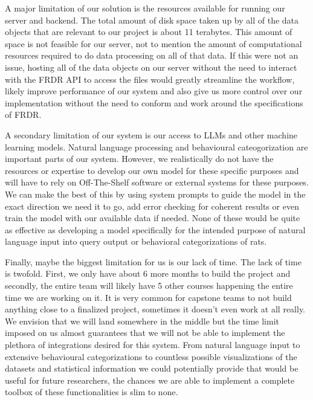 \documentclass[12pt, titlepage]{article}
\begin{document}
\begin{enumerate}
    A major limitation of our solution is the resources available for running our server and backend. The total amount of disk space taken up by 
    all of the data objects that are relevant to our project is about 11 terabytes. This amount of space is not feasible for our server, not to mention
    the amount of computational resources required to do data processing on all of that data. If this were not an issue, hosting all of the data objects
    on our server without the need to interact with the FRDR API to access the files would greatly streamline the workflow, likely improve performance
    of our system and also give us more control over our implementation without the need to conform and work around the specifications of FRDR.

    A secondary limitation of our system is our access to LLMs and other machine learning models. Natural language processing and behavioural cateogorization are important parts of our
    system. However, we realistically do not have the resources or expertise to develop our own model for these specific purposes and will have to rely
    on Off-The-Shelf software or external systems for these purposes. We can make the best of this by using system prompts to guide the model in the exact direction
    we need it to go, add error checking for coherent results or even train the model with our available data if needed. None of these would be quite as 
    effective as developing a model specifically for the intended purpose of natural language input into query output or behavioral categorizations of rats.

    Finally, maybe the biggest limitation for us is our lack of time. The lack of time is twofold. First, we only have about 6 more months to build the project 
    and secondly, the entire team will likely have 5 other courses happening the entire time we are working on it. It is very common for capstone teams to not
    build anything close to a finalized project, sometimes it doesn't even work at all really. We envision that we will land somewhere in the middle but the time limit
    imposed on us almost guarantees that we will not be able to implement the plethora of integrations desired for this system. From natural language input to extensive
    behavioural categorizations to countless possible visualizations of the datasets and statistical information we could potentially provide that would be useful for
    future researchers, the chances we are able to implement a complete toolbox of these functionalities is slim to none.


\end{enumerate}
\end{document}
